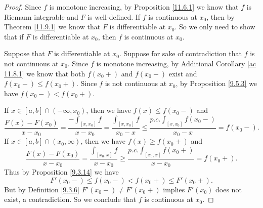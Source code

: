 \begin{proof}
    Since \(f\) is monotone increasing, by Proposition \ref{11.6.1} we know that \(f\) is Riemann integrable and \(F\) is well-defined.
    If \(f\) is continuous at \(x_0\), then by Theorem \ref{11.9.1} we know that \(F\) is differentiable at \(x_0\).
    So we only need to show that if \(F\) is differentiable at \(x_0\), then \(f\) is continuous at \(x_0\).

    Suppose that \(F\) is differentiable at \(x_0\).
    Suppose for sake of contradiction that \(f\) is not continuous at \(x_0\).
    Since \(f\) is monotone increasing, by Additional Corollary \ref{ac 11.8.1} we know that both \(f(x_0+)\) and \(f(x_0-)\) exist and \(f(x_0-) \leq f(x_0+)\).
    Since \(f\) is not continuous at \(x_0\), by Proposition \ref{9.5.3} we have \(f(x_0-) < f(x_0+)\).

    If \(x \in [a, b] \cap (-\infty, x_0)\), then we have \(f(x) \leq f(x_0-)\) and
    \[
        \frac{F(x) - F(x_0)}{x - x_0} = \frac{-\int_{[x, x_0]} f}{x - x_0} = \frac{\int_{[x, x_0]} f}{x_0 - x} \leq \frac{p.c. \int_{[x, x_0]} f(x_0-)}{x_0 - x} = f(x_0-).
    \]
    If \(x \in [a, b] \cap (x_0, \infty)\), then we have \(f(x) \geq f(x_0+)\) and
    \[
        \frac{F(x) - F(x_0)}{x - x_0} = \frac{\int_{[x_0, x]} f}{x - x_0} \geq \frac{p.c. \int_{[x_0, x]} f(x_0+)}{x - x_0} = f(x_0+).
    \]
    Thus by Proposition \ref{9.3.14} we have
    \[
        F'(x_0-) \leq f(x_0-) < f(x_0+) \leq F'(x_0+).
    \]
    But by Definition \ref{9.3.6} \(F'(x_0-) \neq F'(x_0+)\) implies \(F'(x_0)\) does not exist, a contradiction.
    So we conclude that \(f\) is continuous at \(x_0\).
\end{proof}